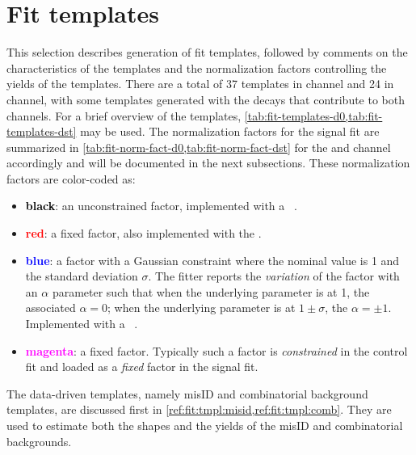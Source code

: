\section{Fit templates}
\label{ref:fit:tmpl}

This selection describes generation of fit templates,
followed by comments on the characteristics of the templates and the
normalization factors controlling the yields of the templates.
There are a total of 37 templates in \Dz channel and 24 in \Dstar channel,
with some templates generated with the decays that contribute to both
channels.
For a brief overview of the templates,
\cref{tab:fit-templates-d0,tab:fit-templates-dst} may be used.
The normalization factors for the signal fit are summarized in
\cref{tab:fit-norm-fact-d0,tab:fit-norm-fact-dst} for the \Dz and \Dstar channel
accordingly and will be documented in the next subsections.
These normalization factors are color-coded as:
\begin{itemize}
    \item \textbf{\textcolor{black}{black}}:
        an unconstrained factor,
        implemented with a \HistFactory\ .
    \item \textbf{\textcolor{red}{red}}:
        a fixed factor,
        also implemented with the .
    \item \textbf{\textcolor{blue}{blue}}:
        a factor with a Gaussian constraint
        where the nominal value is 1 and the standard deviation $\sigma$.
        The fitter reports the \emph{variation} of the factor with an $\alpha$
        parameter such that when the underlying parameter is at 1,
        the associated $\alpha = 0$;
        when the underlying parameter is at $1 \pm \sigma$, the $\alpha = \pm 1$.
        Implemented with a \HistFactory\ .
    \item \textbf{\textcolor{magenta}{magenta}}:
        a fixed  factor.
        Typically such a factor is \emph{constrained} in the control fit and
        loaded as a \emph{fixed} factor in the signal fit.
\end{itemize}





The data-driven templates,
namely \muon misID and combinatorial background templates,
are discussed first in \cref{ref:fit:tmpl:misid,ref:fit:tmpl:comb}.
They are used to estimate both the shapes and the yields of the misID and
combinatorial backgrounds.

